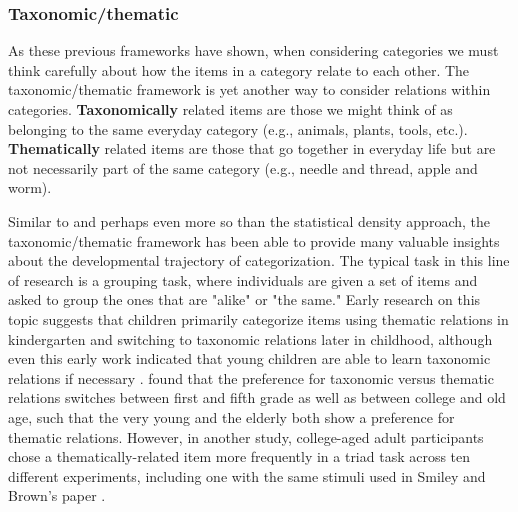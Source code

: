 \documentclass[../dissertation.tex]{subfiles}
\begin{document}
\subsubsection{Taxonomic/thematic}
	As these previous frameworks have shown, when considering categories we must think carefully about how the items in a category relate to each other. The taxonomic/thematic framework is yet another way to consider relations within categories. \textbf{Taxonomically} related items are those we might think of as belonging to the same everyday category (e.g., animals, plants, tools, etc.). \textbf{Thematically} related items are those that go together in everyday life but are not necessarily part of the same category (e.g., needle and thread, apple and worm).  \par
		Similar to and perhaps even more so than the statistical density approach, the taxonomic/thematic framework has been able to provide many valuable insights about the developmental trajectory of categorization. The typical task in this line of research is a grouping task, where individuals are given a set of items and asked to group the ones that are "alike" or "the same." Early research on this topic suggests that children primarily categorize items using thematic relations in kindergarten and switching to taxonomic relations later in childhood, although even this early work indicated that young children are able to learn taxonomic relations if necessary \citep{vygotsky1962language,piaget1964early}. \citet{Smiley1979} found that the preference for taxonomic versus thematic relations switches between first and fifth grade as well as between college and old age, such that the very young and the elderly both show a preference for thematic relations. However, in another study, college-aged adult participants chose a thematically-related item more frequently in a triad task across ten different experiments, including one with the same stimuli used in Smiley and Brown's paper \citep{Lin2001}. \par
\end{document}
